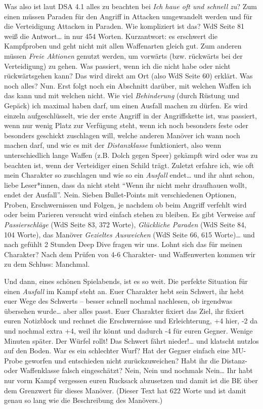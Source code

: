 \documentclass[final]{multiversum}
\begin{document}
Was also ist laut DSA 4.1 alles zu beachten bei \emph{Ich haue oft und schnell
zu}?  Zum einen müssen Paraden für den Angriff in Attacken umgewandelt werden
und für die Verteidigung Attacken in Paraden. Wie kompliziert ist das? WdS Seite
81 weiß die Antwort… in nur 454 Worten. Kurzantwort: es erschwert die
Kampfproben und geht nicht mit allen Waffenarten gleich gut. Zum anderen müssen
\emph{Freie Aktionen} genutzt werden, um vorwärts (bzw. rückwärts bei der
Verteidigung) zu gehen. Was passiert, wenn ich die nicht habe oder nicht
rückwärtsgehen kann? Das wird direkt am Ort (also WdS Seite 60) erklärt. Was
noch alles? Nun. Erst folgt noch ein Abschnitt darüber, mit welchen Waffen ich
das kann und mit welchen nicht. Wie viel \emph{Behinderung} (durch Rüstung und
Gepäck) ich maximal haben darf, um einen Ausfall machen zu dürfen. Es wird
einzeln aufgeschlüsselt, wie der erste Angriff in der Angriffskette ist, was
passiert, wenn nur wenig Platz zur Verfügung steht, wenn ich noch besonders
feste oder besonders geschickt zuschlagen will, welche anderen Manöver ich wann
noch machen darf, und wie es mit der \emph{Distanzklasse} funktioniert, also
wenn unterschiedlich lange Waffen (z.B. Dolch gegen Speer) gekämpft wird oder
was zu beachten ist, wenn der Verteidiger einen Schild trägt. Zuletzt erfahre
ich, wie oft mein Charakter so zuschlagen und wie so ein \emph{Ausfall}
endet\ldots{} und ihr ahnt schon, liebe Leser*innen, dass da nicht steht
\enquote{Wenn ihr nicht mehr draufhauen wollt, endet der Ausfall}. Nein. Sieben
Bullet-Points mit verschiedenen Optionen, Proben, Erschwernissen und Folgen, je
nachdem ob beim Angriff verfehlt wird oder beim Parieren versucht wird einfach
stehen zu bleiben. Es gibt Verweise auf \emph{Passierschläge} (WdS Seite 83, 372
Worte), \emph{Glückliche Paraden} (WdS Seite 84, 104 Worte), das Manöver
\emph{Gezieltes Ausweichen} (WdS Seite 66, 615 Worte)\ldots{} und nach gefühlt 2
Stunden Deep Dive fragen wir uns. Lohnt sich das für meinen Charakter? Nach dem
Prüfen von 4-6 Charakter- und Waffenwerten kommen wir zu dem Schluss: Manchmal.

Und dann, eines schönen Spielabends, ist es so weit. Die perfekte Situation für
einen \emph{Ausfall} im Kampf steht an. Euer Charakter hebt sein Schwert, ihr
hebt euer Wege des Schwerts -- besser schnell nochmal nachlesen, ob irgendwas
übersehen wurde\ldots{} aber alles passt. Euer Charakter fixiert das Ziel, ihr
fixiert euren Notizblock und rechnet die Erschwernisse und Erleichterung, +4
hier, \mbox{-2} da und nochmal extra +4, weil ihr könnt und dadurch \mbox{-4} für euren
Gegner. Wenige Minuten später. Der Würfel rollt! Das Schwert fährt
nieder!\ldots{} und klatscht nutzlos auf den Boden. War es ein schlechter Wurf?
Hat der Gegner einfach eine MU-Probe geworfen und entschieden nicht
zurückzuweichen? Habt ihr die Distanz- oder Waffenklasse falsch eingeschätzt?
Nein, Nein und nochmals Nein\ldots{} Ihr habt nur vorm Kampf vergessen euren
Rucksack abzusetzen und damit ist die BE über dem Grenzwert für dieses Manöver.
(Dieser Text hat 622 Worte und ist damit genau so lang wie die Beschreibung des
Manövers.) 
\end{document}
